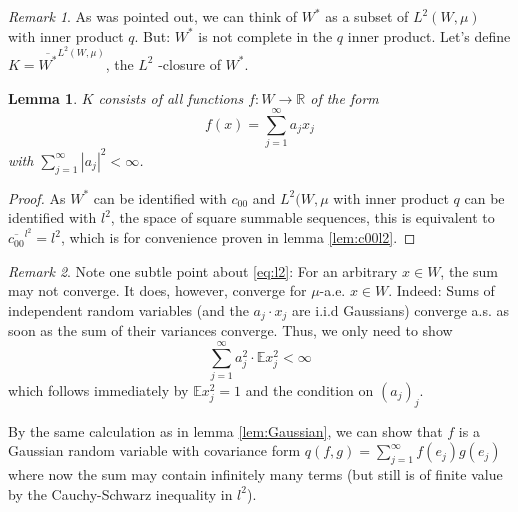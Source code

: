 \documentclass{scrartcl}
\newtheorem{lemma}{Lemma}
\theoremstyle{definition}
\theoremstyle{remark}
\newtheorem{remark}{Remark}
\newcommand{\R}{\mathbb R}
\newcommand{\E}{\mathbb E}
\begin{document}
\begin{remark}
As was pointed out, we can think of $W^*$ as a subset of $L^2(W,\mu)$ with inner product $q$. But: $W^*$ is not complete in the $q$ inner product. Let's define $K = \overline{W^*}^{L^2(W,\mu)}$, the $L^2$ -closure of $W^*$.
\end{remark}
\begin{lemma}
$K$ consists of all functions $f:W\to \R$ of the form
\begin{equation}\label{eq:l2}
f(x) = \sum_{j=1}^\infty a_j x_j
\end{equation}
with $\sum_{j=1}^\infty |a_j|^2 < \infty$.
\end{lemma}
\begin{proof}
As $W^*$ can be identified with $c_{00}$ and $L^2(W,\mu$ with inner product $q$ can be identified with $l^2$, the space of square summable sequences, this is equivalent to $\overline{c_{00}}^{l^2} = l^2$, which is for convenience proven in lemma \ref{lem:c00l2}.
\end{proof}
\begin{remark}
Note one subtle point about \eqref{eq:l2}: For an arbitrary $x\in W$, the sum may not converge. It does, however, converge for $\mu$-a.e. $x\in W$. Indeed: Sums of independent random variables (and the $a_j\cdot x_j$ are i.i.d Gaussians) converge a.s. as soon as the sum of their variances converge. Thus, we only need to show
\[ \sum_{j=1}^\infty a_j^2 \cdot \E x_j^2 < \infty \]
which follows immediately by $\E x_j^2 = 1$ and the condition on $(a_j)_j$.

By the same calculation as in lemma \ref{lem:Gaussian}, we can show that $f$ is a Gaussian random variable with covariance form $q(f, g) = \sum_{j=1}^\infty f(e_j)g(e_j)$ where now the sum may contain infinitely many terms (but still is of finite value by the Cauchy-Schwarz inequality in $l^2$).
\end{remark}
\end{document}
